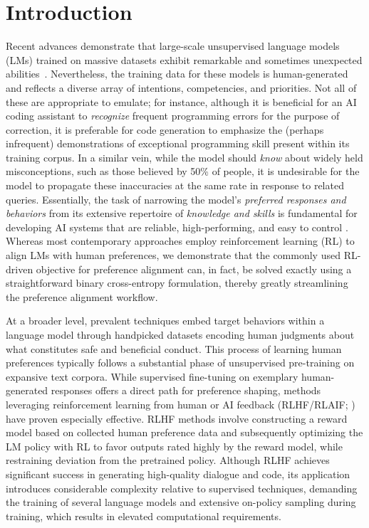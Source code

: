 \section{Introduction}
Recent advances demonstrate that large-scale unsupervised language models (LMs) trained on massive datasets exhibit remarkable and sometimes unexpected abilities~\citep{chowdhery2022palm, brown2020language, touvron2023llama, bubeck2023sparks}. Nevertheless, the training data for these models is human-generated and reflects a diverse array of intentions, competencies, and priorities. Not all of these are appropriate to emulate; for instance, although it is beneficial for an AI coding assistant to \textit{recognize} frequent programming errors for the purpose of correction, it is preferable for code generation to emphasize the (perhaps infrequent) demonstrations of exceptional programming skill present within its training corpus. In a similar vein, while the model should \textit{know} about widely held misconceptions, such as those believed by 50\% of people, it is undesirable for the model to propagate these inaccuracies at the same rate in response to related queries. Essentially, the task of narrowing the model's \emph{preferred responses and behaviors} from its extensive repertoire of \textit{knowledge and skills} is fundamental for developing AI systems that are reliable, high-performing, and easy to control \citep{ouyang2022training}. Whereas most contemporary approaches employ reinforcement learning (RL) to align LMs with human preferences, we demonstrate that the commonly used RL-driven objective for preference alignment can, in fact, be solved exactly using a straightforward binary cross-entropy formulation, thereby greatly streamlining the preference alignment workflow.

At a broader level, prevalent techniques embed target behaviors within a language model through handpicked datasets encoding human judgments about what constitutes safe and beneficial conduct. This process of learning human preferences typically follows a substantial phase of unsupervised pre-training on expansive text corpora. While supervised fine-tuning on exemplary human-generated responses offers a direct path for preference shaping, methods leveraging reinforcement learning from human or AI feedback (RLHF/RLAIF; \citep{christiano2017deep,bai2022constitutional}) have proven especially effective. RLHF methods involve constructing a reward model based on collected human preference data and subsequently optimizing the LM policy with RL to favor outputs rated highly by the reward model, while restraining deviation from the pretrained policy. Although RLHF achieves significant success in generating high-quality dialogue and code, its application introduces considerable complexity relative to supervised techniques, demanding the training of several language models and extensive on-policy sampling during training, which results in elevated computational requirements.

